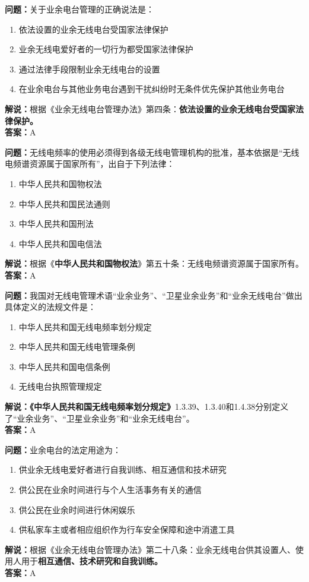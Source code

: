 \textbf{问题：}关于业余电台管理的正确说法是：

\begin{enumerate}[label=\Alph*), leftmargin=1cm]
	\item 依法设置的业余无线电台受国家法律保护
	\item 业余无线电爱好者的一切行为都受国家法律保护
	\item 通过法律手段限制业余无线电台的设置
	\item 在业余电台与其他业务电台遇到干扰纠纷时无条件优先保护其他业务电台
\end{enumerate}

\textbf{解说：}根据《业余无线电台管理办法》第四条：\textbf{依法设置的业余无线电台受国家法律保护。}\\\textbf{答案：}A

\textbf{问题：}无线电频率的使用必须得到各级无线电管理机构的批准，基本依据是“无线电频谱资源属于国家所有”，出自于下列法律：

\begin{enumerate}[label=\Alph*), leftmargin=1cm]
	\item 中华人民共和国物权法
	\item 中华人民共和国民法通则
	\item 中华人民共和国刑法
	\item 中华人民共和国电信法
\end{enumerate}

\textbf{解说：}根据《\textbf{中华人民共和国物权法}》第五十条：无线电频谱资源属于国家所有。\\\textbf{答案：}A

\textbf{问题：}我国对无线电管理术语“业余业务”、“卫星业余业务”和“业余无线电台”做出具体定义的法规文件是：
\begin{enumerate}[label=\Alph*), leftmargin=1cm]
	\item 中华人民共和国无线电频率划分规定
	\item 中华人民共和国无线电管理条例
	\item 中华人民共和国电信条例
	\item 无线电台执照管理规定
\end{enumerate}
\textbf{解说：《中华人民共和国无线电频率划分规定》}1.3.39、1.3.40和1.4.38分别定义了“业余业务”、“卫星业余业务”和“业余无线电台”。\\\textbf{答案：}A

\textbf{问题：}业余电台的法定用途为：
\begin{enumerate}[label=\Alph*), leftmargin=1cm]
	\item 供业余无线电爱好者进行自我训练、相互通信和技术研究
	\item 供公民在业余时间进行与个人生活事务有关的通信
	\item 供公民在业余时间进行休闲娱乐
	\item 供私家车主或者相应组织作为行车安全保障和途中消遣工具
\end{enumerate}
\textbf{解说：}根据《业余无线电台管理办法》第二十八条：业余无线电台供其设置人、使用人用于\textbf{相互通信、技术研究和自我训练。}\\\textbf{答案：}A

